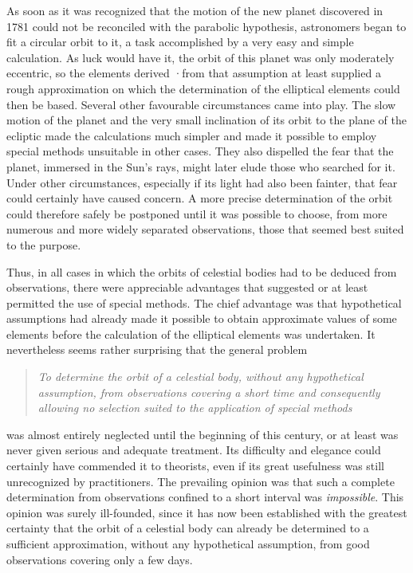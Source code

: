 As soon as it was recognized that the motion of the new planet discovered in 1781 could not be reconciled with the parabolic hypothesis, astronomers began to fit a circular orbit to it, a task accomplished by a very easy and simple calculation. As luck would have it, the orbit of this planet was only moderately eccentric, so the elements derived ·from that assumption at least supplied a rough approximation on which the determination of the elliptical elements could then be based. Several other favourable circumstances came into play. The slow motion of the planet and the very small inclination of its orbit to the plane of the ecliptic made the calculations much simpler and made it possible to employ special methods unsuitable in other cases. They also dispelled the fear that the planet, immersed in the Sun's rays, might later elude those who searched for it. Under other circumstances, especially if its light had also been fainter, that fear could certainly have caused concern. A more precise determination of the orbit could therefore safely be postponed until it was possible to choose, from more numerous and more widely separated observations, those that seemed best suited to the purpose.

Thus, in all cases in which the orbits of celestial bodies had to be deduced from observations, there were appreciable advantages that suggested or at least permitted the use of special methods. The chief advantage was that hypothetical assumptions had already made it possible to obtain approximate values of some elements before the calculation of the elliptical elements was undertaken. It nevertheless seems rather surprising that the general problem

\begin{quote}\itshape
To determine the orbit of a celestial body, without any hypothetical assumption, from observations covering a short time and consequently allowing no selection suited to the application of special methods
\end{quote}
\noindent was almost entirely neglected until the beginning of this century, or at least was never given serious and adequate treatment. Its difficulty and elegance could certainly have commended it to theorists, even if its great usefulness was still unrecognized by practitioners. The prevailing opinion was that such a complete determination from observations confined to a short interval was \emph{impossible}. This opinion was surely ill-founded, since it has now been established with the greatest certainty that the orbit of a celestial body can already be determined to a sufficient approximation, without any hypothetical assumption, from good observations covering only a few days.

